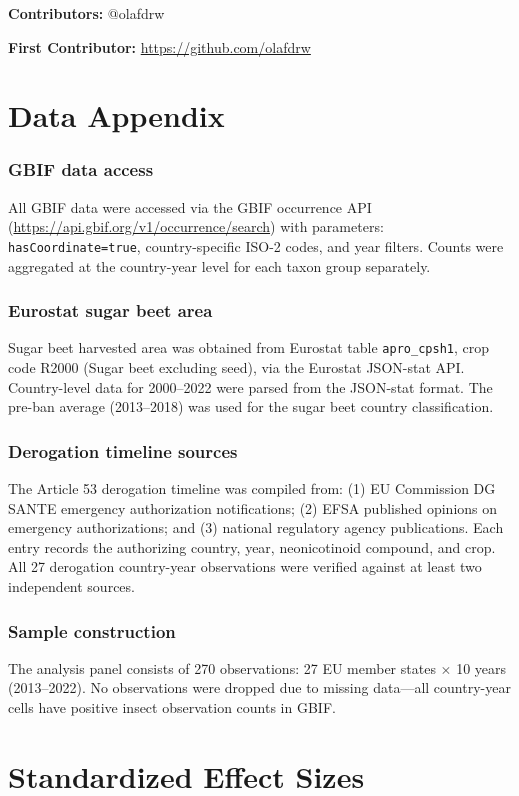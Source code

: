 \documentclass[12pt]{article}
\begin{document}
\noindent\textbf{Contributors:} @olafdrw

\noindent\textbf{First Contributor:} \url{https://github.com/olafdrw}

\label{apep_main_text_end}
\newpage


\newpage
\appendix

\section{Data Appendix}
\label{sec:data_appendix}

\subsubsection*{GBIF data access} All GBIF data were accessed via the GBIF occurrence API (\url{https://api.gbif.org/v1/occurrence/search}) with parameters: \texttt{hasCoordinate=true}, country-specific ISO-2 codes, and year filters. Counts were aggregated at the country-year level for each taxon group separately.

\subsubsection*{Eurostat sugar beet area} Sugar beet harvested area was obtained from Eurostat table \texttt{apro\_cpsh1}, crop code R2000 (Sugar beet excluding seed), via the Eurostat JSON-stat API. Country-level data for 2000--2022 were parsed from the JSON-stat format. The pre-ban average (2013--2018) was used for the sugar beet country classification.

\subsubsection*{Derogation timeline sources} The Article 53 derogation timeline was compiled from: (1) EU Commission DG SANTE emergency authorization notifications; (2) EFSA published opinions on emergency authorizations; and (3) national regulatory agency publications. Each entry records the authorizing country, year, neonicotinoid compound, and crop. All 27 derogation country-year observations were verified against at least two independent sources.

\subsubsection*{Sample construction} The analysis panel consists of 270 observations: 27 EU member states $\times$ 10 years (2013--2022). No observations were dropped due to missing data---all country-year cells have positive insect observation counts in GBIF.

\section{Standardized Effect Sizes}
\label{sec:sde}


\end{document}
